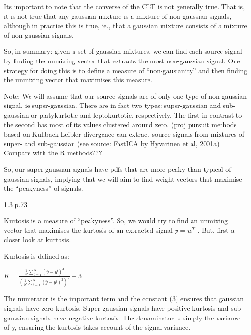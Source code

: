 \documentclass{article}
\begin{document}
Its important to note that the converse of the CLT is not generally true. That is, it is not true that any gaussian mixture is a mixture of non-gaussian signals, although in practice this is true, ie., that a gaussian mixture consists of a mixture of non-gaussian signals. 

So, in summary: given a set of gaussian mixtures, we can find each source signal by finding the unmixing vector that extracts the most non-gaussian signal. One strategy for doing this is to define a measure of “non-gausianity” and then finding the unmixing vector that maximises this measure.

Note: We will assume that our source signals are of only one type of non-gaussian signal, ie super-gaussian. There are in fact two types: super-gaussian and sub-gaussian or platykurtotic and leptokurtotic, respectively. The first in contrast to the second has most of its values clustered around zero. (proj pursuit methods based on Kullback-Leibler divergence can extract source signals from mixtures of super- and sub-gaussian (see source: FastICA by Hyvarinen et al, 2001a) Compare with the R methods???

So, our super-gaussian signals have pdfs that are more peaky than typical of gaussian signals, implying that we will aim to find weight vectors that maximise the “peakyness” of signals.

1.3 p.73

Kurtosis is a measure of “peakyness”. So, we would try to find an unmixing vector that maximises the kurtosis of an extracted signal $y=w^{T}$ . But, first a closer look at kurtosis.

Kurtosis is defined as:





$K=\frac{\frac{1}{N}\sum_{t=1}^{N}(\bar{y}-y^{t})^{4}}{(\frac{1}{N}\sum_{t=1}^{N}(\bar{y}-y^{t})^{2})^{2}}-3$

The numerator is the important term and the constant (3) ensures that gaussian signals have zero kurtosis. Super-gaussian signals have positive kurtosis and sub-gaussian signals have negative kurtosis. The denominator is simply the variance of y, ensuring the kurtosis takes account of the signal variance.
\end{document}
